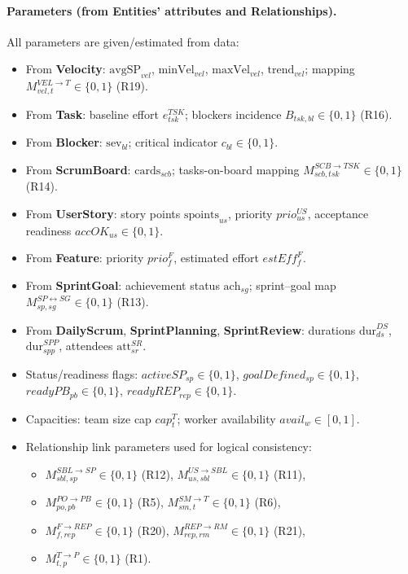 \documentclass[11pt,a4paper]{article}
\begin{document}
\paragraph{Parameters (from Entities' attributes and Relationships).}
All parameters are given/estimated from data:
\begin{itemize}[leftmargin=2.2em]
  \item From \textbf{Velocity}: $\mathrm{avgSP}_{vel}$, $\mathrm{minVel}_{vel}$, $\mathrm{maxVel}_{vel}$, $\mathrm{trend}_{vel}$; mapping $M^{VEL\to T}_{vel,t}\in\{0,1\}$ (R19).
  \item From \textbf{Task}: baseline effort $e^{TSK}_{tsk}$; blockers incidence $B_{tsk,bl}\in\{0,1\}$ (R16).
  \item From \textbf{Blocker}: $\mathrm{sev}_{bl}$; critical indicator $c_{bl}\in\{0,1\}$.
  \item From \textbf{ScrumBoard}: $\mathrm{cards}_{scb}$; tasks-on-board mapping $M^{SCB\to TSK}_{scb,tsk}\in\{0,1\}$ (R14).
  \item From \textbf{UserStory}: story points $\mathrm{spoints}_{us}$, priority $prio^{US}_{us}$, acceptance readiness $accOK_{us}\in\{0,1\}$.
  \item From \textbf{Feature}: priority $prio^{F}_{f}$, estimated effort $estEff^{F}_{f}$.
  \item From \textbf{SprintGoal}: achievement status $\mathrm{ach}_{sg}$; sprint--goal map $M^{SP\leftrightarrow SG}_{sp,sg}\in\{0,1\}$ (R13).
  \item From \textbf{DailyScrum}, \textbf{SprintPlanning}, \textbf{SprintReview}: durations $\mathrm{dur}^{DS}_{ds}$, $\mathrm{dur}^{SPP}_{spp}$, attendees $\mathrm{att}^{SR}_{sr}$.
  \item Status/readiness flags: $activeSP_{sp}\in\{0,1\}$, $goalDefined_{sp}\in\{0,1\}$, $readyPB_{pb}\in\{0,1\}$, $readyREP_{rep}\in\{0,1\}$.
  \item Capacities: team size cap $cap^{T}_{t}$; worker availability $avail_{w}\in[0,1]$.
  \item Relationship link parameters used for logical consistency:
    \begin{itemize}
      \item $M^{SBL\to SP}_{sbl,sp}\in\{0,1\}$ (R12), $M^{US\to SBL}_{us,sbl}\in\{0,1\}$ (R11),
      \item $M^{PO\to PB}_{po,pb}\in\{0,1\}$ (R5), $M^{SM\to T}_{sm,t}\in\{0,1\}$ (R6),
      \item $M^{F\to REP}_{f,rep}\in\{0,1\}$ (R20), $M^{REP\to RM}_{rep,rm}\in\{0,1\}$ (R21),
      \item $M^{T\to P}_{t,p}\in\{0,1\}$ (R1).
    \end{itemize}
\end{itemize}
\end{document}

